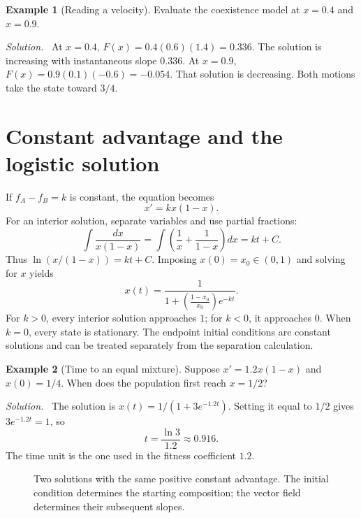 \documentclass[11pt,oneside,openany]{book}
\theoremstyle{definition}
\newtheorem{example}{Example}[chapter]
\theoremstyle{remark}
\newenvironment{solution}{\par\smallskip\noindent\textit{Solution.}\ }{\par\smallskip}
\numberwithin{equation}{chapter}
\begin{document}
\begin{example}[Reading a velocity]
Evaluate the coexistence model at $x=0.4$ and $x=0.9$.
\begin{solution}
At $x=0.4$, $F(x)=0.4(0.6)(1.4)=0.336$. The solution is increasing with instantaneous slope $0.336$. At $x=0.9$, $F(x)=0.9(0.1)(-0.6)=-0.054$. That solution is decreasing. Both motions take the state toward $3/4$.
\end{solution}
\end{example}

\section{Constant advantage and the logistic solution}
If $f_A-f_B=k$ is constant, the equation becomes
\[
x'=kx(1-x).
\]
For an interior solution, separate variables and use partial fractions:
\[
\int\frac{dx}{x(1-x)}=\int\left(\frac1x+\frac1{1-x}\right)dx=kt+C.
\]
Thus $\ln(x/(1-x))=kt+C$. Imposing $x(0)=x_0\in(0,1)$ and solving for $x$ yields
\begin{equation}\label{eq:logisticsolution}
\boxed{x(t)=\frac{1}{1+\left(\frac{1-x_0}{x_0}\right)e^{-kt}}.}
\end{equation}
For $k>0$, every interior solution approaches $1$; for $k<0$, it approaches $0$. When $k=0$, every state is stationary. The endpoint initial conditions are constant solutions and can be treated separately from the separation calculation.

\begin{example}[Time to an equal mixture]
Suppose $x'=1.2x(1-x)$ and $x(0)=1/4$. When does the population first reach $x=1/2$?
\begin{solution}
The solution is $x(t)=1/(1+3e^{-1.2t})$. Setting it equal to $1/2$ gives $3e^{-1.2t}=1$, so
\[
t=\frac{\ln3}{1.2}\approx0.916.
\]
The time unit is the one used in the fitness coefficient $1.2$.
\end{solution}
\end{example}

\begin{figure}[htbp]
\centering
{}
\caption{Two solutions with the same positive constant advantage. The initial condition determines the starting composition; the vector field determines their subsequent slopes.}
\end{figure}
\end{document}
